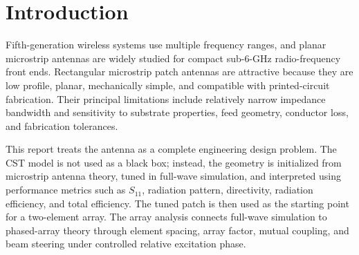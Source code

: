 \section{Introduction}
\label{sec:introduction}

Fifth-generation wireless systems use multiple frequency ranges, and planar microstrip antennas are
widely studied for compact sub-6-GHz radio-frequency front ends. Rectangular microstrip patch
antennas are attractive because they are low profile, planar, mechanically simple, and compatible
with printed-circuit fabrication. Their principal limitations include relatively narrow impedance
bandwidth and sensitivity to substrate properties, feed geometry, conductor loss, and fabrication
tolerances.

This report treats the antenna as a complete engineering design problem. The CST model is not used
as a black box; instead, the geometry is initialized from microstrip antenna theory, tuned in
full-wave simulation, and interpreted using performance metrics such as \(S_{11}\), radiation
pattern, directivity, radiation efficiency, and total efficiency. The tuned patch is then used as the
starting point for a two-element array. The array analysis connects full-wave simulation to phased-array
theory through element spacing, array factor, mutual coupling, and beam steering under controlled
relative excitation phase.
